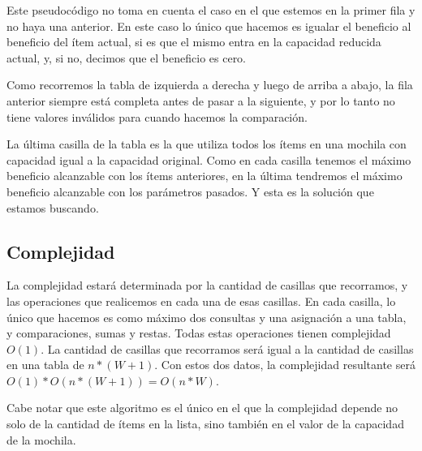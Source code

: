 \documentclass[10pt, a4paper]{article}
\begin{document}
Este pseudocódigo no toma en cuenta el caso en el que estemos en la primer fila y no haya una anterior. En este caso lo único que hacemos es igualar el beneficio al beneficio del ítem actual, si es que el mismo entra en la capacidad reducida actual, y, si no, decimos que el beneficio es cero.\par
Como recorremos la tabla de izquierda a derecha y luego de arriba a abajo, la fila anterior siempre está completa antes de pasar a la siguiente, y por lo tanto no tiene valores inválidos para cuando hacemos la comparación.\par
La última casilla de la tabla es la que utiliza todos los ítems en una mochila con capacidad igual a la capacidad original. Como en cada casilla tenemos el máximo beneficio alcanzable con los ítems anteriores, en la última tendremos el máximo beneficio alcanzable con los parámetros pasados. Y esta es la solución que estamos buscando.\par

\subsection{Complejidad}
La complejidad estará determinada por la cantidad de casillas que recorramos, y las operaciones que realicemos en cada una de esas casillas. En cada casilla, lo único que hacemos es como máximo dos consultas y una asignación a una tabla, y comparaciones, sumas y restas. Todas estas operaciones tienen complejidad $O(1)$. La cantidad de casillas que recorramos será igual a la cantidad de casillas en una tabla de $n*(W+1)$. Con estos dos datos, la complejidad resultante será $O(1) * O(n*(W+1)) = O(n*W)$.\par
Cabe notar que este algoritmo es el único en el que la complejidad depende no solo de la cantidad de ítems en la lista, sino también en el valor de la capacidad de la mochila.
\end{document}
